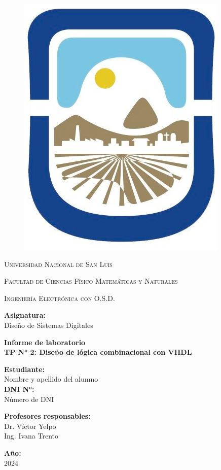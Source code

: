 \documentclass{article}
\begin{document}
	
	\begin{titlepage}	  
		\centering
		
		\begin{figure}
			\centering
			\includegraphics[width=0.15\linewidth]{logo-unsl.jpg}
		\end{figure}    
		
		{\scshape\LARGE Universidad Nacional de San Luis\par}
		{\scshape Facultad de Ciencias Físico Matemáticas y Naturales\par}
		{\scshape Ingeniería Electrónica con O.S.D.\par}
		\bigskip 
		\bigskip 
		\bigskip 
		
		\Large \textbf {Asignatura:\\} 
		\LARGE Diseño de Sistemas Digitales	
		\bigskip 
		\bigskip 
		\bigskip
		\bigskip
		
		\LARGE \textbf {Informe de laboratorio\\}
		\LARGE \textbf {TP N° 2: Diseño de lógica combinacional con VHDL}
		
		\bigskip
		\bigskip
		\bigskip
		
		\LARGE \textbf {Estudiante:\\} 
		\LARGE Nombre y apellido del alumno\\
		\bigskip
		\Large \textbf {DNI N°:\\} 
		\Large Número de DNI	
		
		\bigskip
		\bigskip
		\bigskip
		\bigskip
		\bigskip
		\bigskip
		
		\Large \textbf {Profesores responsables:\\} 
		\Large Dr. Víctor Yelpo \\ Ing. Ivana Trento
		
		\bigskip
		\bigskip
		\bigskip
		\bigskip
		\bigskip
		\bigskip
		\bigskip
		\bigskip
		\bigskip
		
		\Large \textbf {Año:\\} 
		\Large 2024	
	\end{titlepage}
	\newpage
	
	
	
	
	
	
\end{document}
